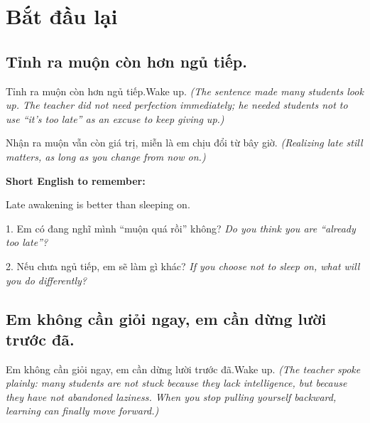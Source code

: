 \chapter{Bắt đầu lại}

\section{Tỉnh ra muộn còn hơn ngủ tiếp.}
\begin{truyen}{Tỉnh ra muộn còn hơn ngủ tiếp.}{Wake up.}
\textit{(The sentence made many students look up. The teacher did not need perfection immediately; he needed students not to use “it's too late” as an excuse to keep giving up.)}
\end{truyen}

\begin{baihoc}
Nhận ra muộn vẫn còn giá trị, miễn là em chịu đổi từ bây giờ.
\textit{(Realizing late still matters, as long as you change from now on.)}
\end{baihoc}

\begin{ghinhoanh}
\textbf{Short English to remember:}

Late awakening is better than sleeping on.

\end{ghinhoanh}

\begin{tuhocnhanh}
1. Em có đang nghĩ mình “muộn quá rồi” không? \textit{Do you think you are “already too late”?}

2. Nếu chưa ngủ tiếp, em sẽ làm gì khác? \textit{If you choose not to sleep on, what will you do differently?}
\end{tuhocnhanh}
\ngancach

\section{Em không cần giỏi ngay, em cần dừng lười trước đã.}
\begin{truyen}{Em không cần giỏi ngay, em cần dừng lười trước đã.}{Wake up.}
\textit{(The teacher spoke plainly: many students are not stuck because they lack intelligence, but because they have not abandoned laziness. When you stop pulling yourself backward, learning can finally move forward.)}
\end{truyen}


